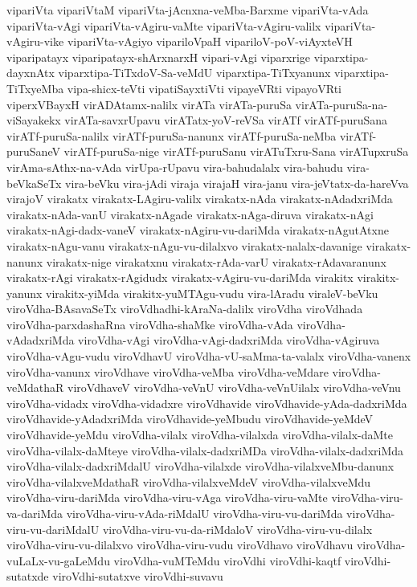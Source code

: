 {vipariVta
vipariVtaM
vipariVta-jAcnxna-veMba-Barxme
vipariVta-vAda
vipariVta-vAgi
vipariVta-vAgiru-vaMte
vipariVta-vAgiru-valilx
vipariVta-vAgiru-vike
vipariVta-vAgiyo
vipariloVpaH
vipariloV-poV-viAyxteVH
viparipatayx
viparipatayx-shArxnarxH
vipari-vAgi
viparxrige
viparxtipa-dayxnAtx
viparxtipa-TiTxdoV-Sa-veMdU
viparxtipa-TiTxyanunx
viparxtipa-TiTxyeMba
vipa-shicx-teVti
vipatiSayxtiVti
vipayeVRti
vipayoVRti
viperxVBayxH
virADAtamx-nalilx
virATa
virATa-puruSa
virATa-puruSa-na-viSayakekx
virATa-savxrUpavu
virATatx-yoV-reVSa
virATf
virATf-puruSana
virATf-puruSa-nalilx
virATf-puruSa-nanunx
virATf-puruSa-neMba
virATf-puruSaneV
virATf-puruSa-nige
virATf-puruSanu
virATuTxru-Sana
virATupxruSa
virAma-sAthx-na-vAda
virUpa-rUpavu
vira-bahudalalx
vira-bahudu
vira-beVkaSeTx
vira-beVku
vira-jAdi
viraja
virajaH
vira-janu
vira-jeVtatx-da-hareVva
virajoV
virakatx
virakatx-LAgiru-valilx
virakatx-nAda
virakatx-nAdadxriMda
virakatx-nAda-vanU
virakatx-nAgade
virakatx-nAga-diruva
virakatx-nAgi
virakatx-nAgi-dadx-vaneV
virakatx-nAgiru-vu-dariMda
virakatx-nAgutAtxne
virakatx-nAgu-vanu
virakatx-nAgu-vu-dilalxvo
virakatx-nalalx-davanige
virakatx-nanunx
virakatx-nige
virakatxnu
virakatx-rAda-varU
virakatx-rAdavaranunx
virakatx-rAgi
virakatx-rAgidudx
virakatx-vAgiru-vu-dariMda
virakitx
virakitx-yanunx
virakitx-yiMda
virakitx-yuMTAgu-vudu
vira-lAradu
viraleV-beVku
viroVdha-BAsavaSeTx
viroVdhadhi-kAraNa-dalilx
viroVdha
viroVdhada
viroVdha-parxdashaRna
viroVdha-shaMke
viroVdha-vAda
viroVdha-vAdadxriMda
viroVdha-vAgi
viroVdha-vAgi-dadxriMda
viroVdha-vAgiruva
viroVdha-vAgu-vudu
viroVdhavU
viroVdha-vU-saMma-ta-valalx
viroVdha-vanenx
viroVdha-vanunx
viroVdhave
viroVdha-veMba
viroVdha-veMdare
viroVdha-veMdathaR
viroVdhaveV
viroVdha-veVnU
viroVdha-veVnUilalx
viroVdha-veVnu
viroVdha-vidadx
viroVdha-vidadxre
viroVdhavide
viroVdhavide-yAda-dadxriMda
viroVdhavide-yAdadxriMda
viroVdhavide-yeMbudu
viroVdhavide-yeMdeV
viroVdhavide-yeMdu
viroVdha-vilalx
viroVdha-vilalxda
viroVdha-vilalx-daMte
viroVdha-vilalx-daMteye
viroVdha-vilalx-dadxriMDa
viroVdha-vilalx-dadxriMda
viroVdha-vilalx-dadxriMdalU
viroVdha-vilalxde
viroVdha-vilalxveMbu-danunx
viroVdha-vilalxveMdathaR
viroVdha-vilalxveMdeV
viroVdha-vilalxveMdu
viroVdha-viru-dariMda
viroVdha-viru-vAga
viroVdha-viru-vaMte
viroVdha-viru-va-dariMda
viroVdha-viru-vAda-riMdalU
viroVdha-viru-vu-dariMda
viroVdha-viru-vu-dariMdalU
viroVdha-viru-vu-da-riMdaloV
viroVdha-viru-vu-dilalx
viroVdha-viru-vu-dilalxvo
viroVdha-viru-vudu
viroVdhavo
viroVdhavu
viroVdha-vuLaLx-vu-gaLeMdu
viroVdha-vuMTeMdu
viroVdhi
viroVdhi-kaqtf
viroVdhi-sutatxde
viroVdhi-sutatxve
viroVdhi-suvavu
}
